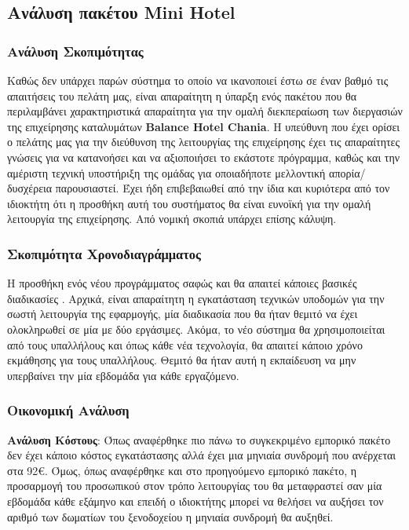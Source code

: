 \subsection{Ανάλυση πακέτου Mini Hotel}
\subsubsection{Ανάλυση Σκοπιμότητας}
Καθώς δεν υπάρχει παρών σύστημα το οποίο να ικανοποιεί έστω σε έναν βαθμό τις 
απαιτήσεις του πελάτη μας, είναι απαραίτητη η ύπαρξη ενός πακέτου που θα 
περιλαμβάνει χαρακτηριστικά απαραίτητα για την ομαλή διεκπεραίωση των 
διεργασιών της επιχείρησης καταλυμάτων \textbf{Balance Hotel Chania}. Η υπεύθυνη 
που έχει ορίσει ο πελάτης μας για την διεύθυνση της λειτουργίας της επιχείρησης έχει 
τις απαραίτητες γνώσεις για να κατανοήσει και να αξιοποιήσει το εκάστοτε πρόγραμμα, 
καθώς και την αμέριστη τεχνική υποστήριξη της ομάδας για οποιαδήποτε μελλοντική 
απορία/ δυσχέρεια παρουσιαστεί. Έχει ήδη επιβεβαιωθεί από την ίδια και κυριότερα 
από τον ιδιοκτήτη ότι η προσθήκη αυτή του συστήματος θα είναι ευνοϊκή για την ομαλή 
λειτουργία της επιχείρησης. Από νομική σκοπιά υπάρχει επίσης κάλυψη.

\subsubsection{Σκοπιμότητα Χρονοδιαγράμματος}
Η προσθήκη ενός νέου προγράμματος σαφώς και θα απαιτεί κάποιες βασικές διαδικασίες .
Αρχικά, είναι απαραίτητη η εγκατάσταση τεχνικών υποδομών για την σωστή λειτουργία 
της εφαρμογής, μία διαδικασία που θα ήταν θεμιτό να έχει ολοκληρωθεί σε μία με δύο 
εργάσιμες. Ακόμα, το νέο σύστημα θα χρησιμοποιείται από τους υπαλλήλους και όπως 
κάθε νέα τεχνολογία, θα απαιτεί κάποιο χρόνο εκμάθησης για τους υπαλλήλους. Θεμιτό 
θα ήταν αυτή η εκπαίδευση να μην υπερβαίνει την μία εβδομάδα για κάθε εργαζόμενο.

\subsubsection{Οικονομική Ανάλυση}
\textbf{Ανάλυση Κόστους}: Όπως αναφέρθηκε πιο πάνω το συγκεκριμένο εμπορικό πακέτο 
δεν έχει κάποιο κόστος εγκατάστασης αλλά έχει μια μηνιαία συνδρομή που ανέρχεται στα 92€. 
Όμως, όπως αναφέρθηκε και στο προηγούμενο εμπορικό πακέτο, η προσαρμογή του 
προσωπικού στον τρόπο λειτουργίας του θα μεταφραστεί σαν μία εβδομάδα κάθε εξάμηνο 
και επειδή ο ιδιοκτήτης μπορεί να θελήσει να  αυξήσει τον αριθμό των δωματίων του 
ξενοδοχείου η μηνιαία συνδρομή θα αυξηθεί.

